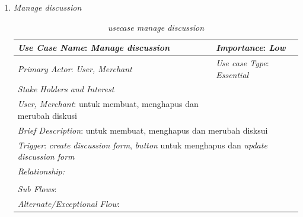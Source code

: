 \documentclass[a4paper]{article}
\begin{document}
\begin{enumerate}
\begin{enumerate}
        \newpage

        \item \textit{Manage discussion}
\begin{table}[h]
    \centering
    \caption{\textit{usecase manage discussion} }
    \begin{tabular}{|lll}
    \hline
    \multicolumn{1}{|l|}{\textit{Use Case Name}: \textit{Manage discussion}}             & \multicolumn{2}{l|}{\textit{Importance}: \textit{Low}}   \\ \hline
    \multicolumn{1}{|l|}{\textit{Primary Actor}: \textit{User, Merchant}}             & \multicolumn{2}{l|}{\textit{Use case Type}: \textit{Essential}} \\ \hline
    \multicolumn{1}{|l|}{\textit{Stake Holders and Interest}} &                               &                               \\ \cline{1-1}
    \multicolumn{1}{|l|}{\textit{User, Merchant}: untuk membuat, menghapus dan merubah diskusi}                                                     &                               &                               \\ \hline
    \multicolumn{3}{|l|}{\textit{Brief Description}: untuk membuat, menghapus dan merubah disksui}                                                                         \\ \hline
    \multicolumn{3}{|l|}{\textit{Trigger}: \textit{create discussion form}, \textit{button} untuk menghapus dan \textit{update discussion form}}                                                                                   \\ \hline
    \multicolumn{3}{|l|}{\textit{Relationship:}}                                                                              \\ \hline
    \multicolumn{3}{|l|}{}                                                                                                                     \\ \hline
    \multicolumn{3}{|l|}{\textit{Sub Flows}:}                                                                                 \\ \hline
    \multicolumn{3}{|l|}{\textit{Alternate/Exceptional Flow}:}                                                                \\ \hline
    \end{tabular}
\end{table}


\end{enumerate}
\end{enumerate}
\end{document}

